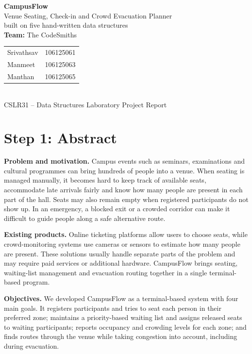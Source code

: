 \documentclass[11pt,a4paper]{article}
\newcommand{\TeamName}{The CodeSmiths}
\newcommand{\MemberOne}{Srivathsav}
\newcommand{\RegOne}{106125061}
\newcommand{\MemberTwo}{Manmeet}
\newcommand{\RegTwo}{106125063}
\newcommand{\MemberThree}{Manthan}
\newcommand{\RegThree}{106125065}
\begin{document}
\begin{center}
  {\Large\bfseries CampusFlow}\\[4pt]
  {\large Venue Seating, Check-in and Crowd Evacuation Planner\\
  built on five hand-written data structures}\\[10pt]
  \textbf{Team:} \TeamName\\[4pt]
  \begin{tabular}{ll}
    \MemberOne & \RegOne\\
    \MemberTwo & \RegTwo\\
    \MemberThree & \RegThree
  \end{tabular}\\[6pt]
  CSLR31 -- Data Structures Laboratory Project Report
\end{center}

\section*{Step 1: Abstract}

\textbf{Problem and motivation.}
Campus events such as seminars, examinations and cultural programmes can bring
hundreds of people into a venue. When seating is managed manually, it becomes
hard to keep track of available seats, accommodate late arrivals fairly and
know how many people are present in each part of the hall. Seats may also remain
empty when registered participants do not show up. In an emergency, a blocked
exit or a crowded corridor can make it difficult to guide people along a safe
alternative route.

\textbf{Existing products.}
Online ticketing platforms allow users to choose seats, while crowd-monitoring
systems use cameras or sensors to estimate how many people are present. These
solutions usually handle separate parts of the problem and may require paid
services or additional hardware. CampusFlow brings seating, waiting-list
management and evacuation routing together in a single terminal-based program.

\textbf{Objectives.}
We developed CampusFlow as a terminal-based system with four main goals. It
registers participants and tries to seat each person in their preferred zone;
maintains a priority-based waiting list and assigns released seats to waiting
participants; reports occupancy and crowding levels for each zone; and finds
routes through the venue while taking congestion into account, including during
evacuation.
\end{document}
